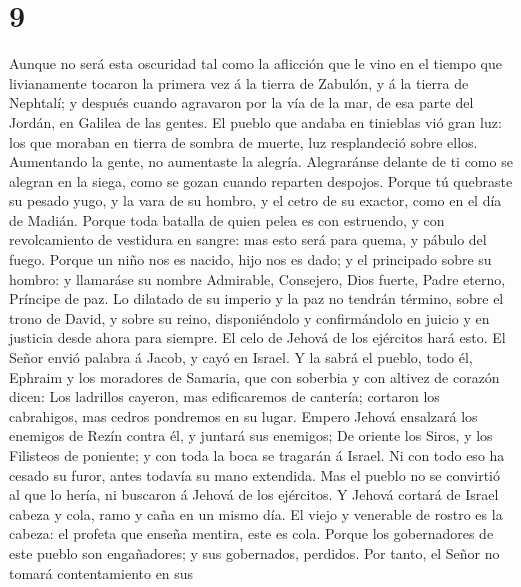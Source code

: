 \hypertarget{section-8}{%
\section{9}\label{section-8}}

 Aunque no será esta oscuridad tal como la aflicción que
le vino en el tiempo que livianamente tocaron la primera vez á la tierra
de Zabulón, y á la tierra de Nephtalí; y después cuando agravaron por la
vía de la mar, de esa parte del Jordán, en Galilea de las gentes.
 El pueblo que andaba en tinieblas vió gran luz: los que
moraban en tierra de sombra de muerte, luz resplandeció sobre ellos.
 Aumentando la gente, no aumentaste la alegría.
Alegraránse delante de ti como se alegran en la siega, como se gozan
cuando reparten despojos.  Porque tú quebraste su pesado
yugo, y la vara de su hombro, y el cetro de su exactor, como en el día
de Madián.  Porque toda batalla de quien pelea es con
estruendo, y con revolcamiento de vestidura en sangre: mas esto será
para quema, y pábulo del fuego.  Porque un niño nos es
nacido, hijo nos es dado; y el principado sobre su hombro: y llamaráse
su nombre Admirable, Consejero, Dios fuerte, Padre eterno, Príncipe de
paz.  Lo dilatado de su imperio y la paz no tendrán
término, sobre el trono de David, y sobre su reino, disponiéndolo y
confirmándolo en juicio y en justicia desde ahora para siempre. El celo
de Jehová de los ejércitos hará esto.  El Señor envió
palabra á Jacob, y cayó en Israel.  Y la sabrá el pueblo,
todo él, Ephraim y los moradores de Samaria, que con soberbia y con
altivez de corazón dicen:  Los ladrillos cayeron, mas
edificaremos de cantería; cortaron los cabrahigos, mas cedros pondremos
en su lugar.  Empero Jehová ensalzará los enemigos de
Rezín contra él, y juntará sus enemigos;  De oriente los
Siros, y los Filisteos de poniente; y con toda la boca se tragarán á
Israel. Ni con todo eso ha cesado su furor, antes todavía su mano
extendida.  Mas el pueblo no se convirtió al que lo
hería, ni buscaron á Jehová de los ejércitos.  Y Jehová
cortará de Israel cabeza y cola, ramo y caña en un mismo día.
 El viejo y venerable de rostro es la cabeza: el profeta
que enseña mentira, este es cola.  Porque los
gobernadores de este pueblo son engañadores; y sus gobernados, perdidos.
 Por tanto, el Señor no tomará contentamiento en sus
